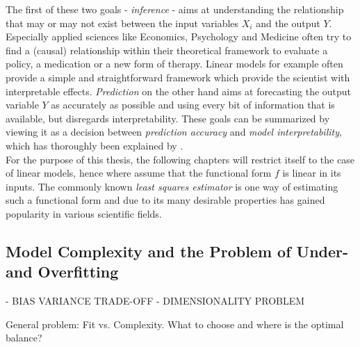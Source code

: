 \documentclass[12pt,a4paper]{article}
\newenvironment{lightbluebox}{%
    \begin{tcolorbox}[colback=lightblue, colframe=lightblue, fontupper=\itshape]%
}{%
    \end{tcolorbox}%
}
\begin{document}
The first of these two goals - \textit{inference} - aims at understanding the relationship that may or may not exist between the input variables $X_i$ and the output $Y$. Especially applied sciences like Economics, Psychology and Medicine often try to find a (causal) relationship within their theoretical framework to evaluate a policy, a medication or a new form of therapy. Linear models for example often provide a simple and straightforward framework which provide the scientist with interpretable effects. \textit{Prediction} on the other hand aims at forecasting the output variable $Y$ as accurately as possible and using every bit of information that is available, but disregards interpretability. \parencite{ESL,21} These goals can be summarized by viewing it as a decision between \textit{prediction accuracy} and \textit{model interpretability}, which has thoroughly been explained by \textcite{ESL}.\\

For the purpose of this thesis, the following chapters will restrict itself to the case of linear models, hence where assume that the functional form $f$ is linear in its inputs. The commonly known \textit{least squares estimator} is one way of estimating such a functional form and due to its many desirable properties has gained popularity in various  scientific fields. 

\subsection{Model Complexity and the Problem of Under- and Overfitting}

\begin{lightbluebox}
- BIAS VARIANCE TRADE-OFF
- DIMENSIONALITY PROBLEM

General problem: Fit vs. Complexity. What to choose and where is the optimal balance?
\end{lightbluebox}
\end{document}
